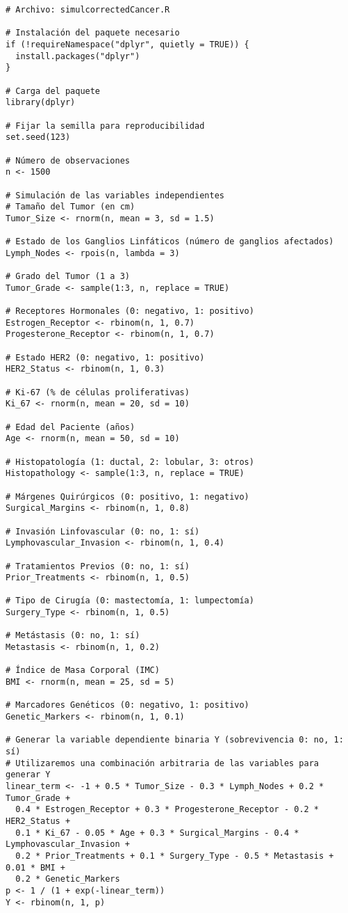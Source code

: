 \begin{verbatim}
# Archivo: simulcorrectedCancer.R

# Instalación del paquete necesario
if (!requireNamespace("dplyr", quietly = TRUE)) {
  install.packages("dplyr")
}

# Carga del paquete
library(dplyr)

# Fijar la semilla para reproducibilidad
set.seed(123)

# Número de observaciones
n <- 1500

# Simulación de las variables independientes
# Tamaño del Tumor (en cm)
Tumor_Size <- rnorm(n, mean = 3, sd = 1.5)

# Estado de los Ganglios Linfáticos (número de ganglios afectados)
Lymph_Nodes <- rpois(n, lambda = 3)

# Grado del Tumor (1 a 3)
Tumor_Grade <- sample(1:3, n, replace = TRUE)

# Receptores Hormonales (0: negativo, 1: positivo)
Estrogen_Receptor <- rbinom(n, 1, 0.7)
Progesterone_Receptor <- rbinom(n, 1, 0.7)

# Estado HER2 (0: negativo, 1: positivo)
HER2_Status <- rbinom(n, 1, 0.3)

# Ki-67 (% de células proliferativas)
Ki_67 <- rnorm(n, mean = 20, sd = 10)

# Edad del Paciente (años)
Age <- rnorm(n, mean = 50, sd = 10)

# Histopatología (1: ductal, 2: lobular, 3: otros)
Histopathology <- sample(1:3, n, replace = TRUE)

# Márgenes Quirúrgicos (0: positivo, 1: negativo)
Surgical_Margins <- rbinom(n, 1, 0.8)

# Invasión Linfovascular (0: no, 1: sí)
Lymphovascular_Invasion <- rbinom(n, 1, 0.4)

# Tratamientos Previos (0: no, 1: sí)
Prior_Treatments <- rbinom(n, 1, 0.5)

# Tipo de Cirugía (0: mastectomía, 1: lumpectomía)
Surgery_Type <- rbinom(n, 1, 0.5)

# Metástasis (0: no, 1: sí)
Metastasis <- rbinom(n, 1, 0.2)

# Índice de Masa Corporal (IMC)
BMI <- rnorm(n, mean = 25, sd = 5)

# Marcadores Genéticos (0: negativo, 1: positivo)
Genetic_Markers <- rbinom(n, 1, 0.1)

# Generar la variable dependiente binaria Y (sobrevivencia 0: no, 1: sí)
# Utilizaremos una combinación arbitraria de las variables para generar Y
linear_term <- -1 + 0.5 * Tumor_Size - 0.3 * Lymph_Nodes + 0.2 * Tumor_Grade + 
  0.4 * Estrogen_Receptor + 0.3 * Progesterone_Receptor - 0.2 * HER2_Status + 
  0.1 * Ki_67 - 0.05 * Age + 0.3 * Surgical_Margins - 0.4 * Lymphovascular_Invasion +
  0.2 * Prior_Treatments + 0.1 * Surgery_Type - 0.5 * Metastasis + 0.01 * BMI + 
  0.2 * Genetic_Markers
p <- 1 / (1 + exp(-linear_term))
Y <- rbinom(n, 1, p)


\end{verbatim}
